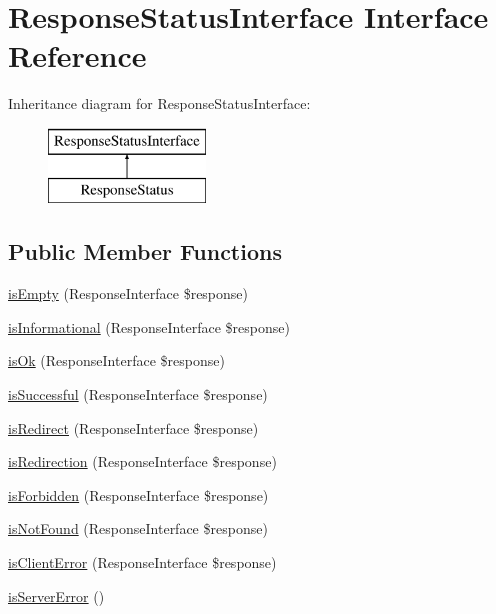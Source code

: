 \hypertarget{interface_pes_1_1_http_1_1_response_status_interface}{}\section{Response\+Status\+Interface Interface Reference}
\label{interface_pes_1_1_http_1_1_response_status_interface}
Inheritance diagram for Response\+Status\+Interface\+:\begin{figure}[H]
\begin{center}
\leavevmode
\includegraphics[height=2.000000cm]{interface_pes_1_1_http_1_1_response_status_interface}
\end{center}
\end{figure}
\subsection*{Public Member Functions}
\begin{DoxyCompactItemize}
\item 
\mbox{\hyperlink{interface_pes_1_1_http_1_1_response_status_interface_a5166ac30ac60791ad8c30d76038b9371}{is\+Empty}} (Response\+Interface \$response)
\item 
\mbox{\hyperlink{interface_pes_1_1_http_1_1_response_status_interface_aefe91e716fcd58aed7eea5eade4b7cc0}{is\+Informational}} (Response\+Interface \$response)
\item 
\mbox{\hyperlink{interface_pes_1_1_http_1_1_response_status_interface_ab3105c65ed8a2617a4928f250dba979f}{is\+Ok}} (Response\+Interface \$response)
\item 
\mbox{\hyperlink{interface_pes_1_1_http_1_1_response_status_interface_ac9309d8cf733cca95b953596caeb3969}{is\+Successful}} (Response\+Interface \$response)
\item 
\mbox{\hyperlink{interface_pes_1_1_http_1_1_response_status_interface_af59c219f65321f33f460c22d5661b751}{is\+Redirect}} (Response\+Interface \$response)
\item 
\mbox{\hyperlink{interface_pes_1_1_http_1_1_response_status_interface_a5b211efda150fe422f2ae707392168d6}{is\+Redirection}} (Response\+Interface \$response)
\item 
\mbox{\hyperlink{interface_pes_1_1_http_1_1_response_status_interface_aa0084ca7689eec6f23e6ea5f30e228fa}{is\+Forbidden}} (Response\+Interface \$response)
\item 
\mbox{\hyperlink{interface_pes_1_1_http_1_1_response_status_interface_aef4db1f3ebf7e7ddcf51de3af3471713}{is\+Not\+Found}} (Response\+Interface \$response)
\item 
\mbox{\hyperlink{interface_pes_1_1_http_1_1_response_status_interface_a3f4db87c51272174be28176a2919633d}{is\+Client\+Error}} (Response\+Interface \$response)
\item 
\mbox{\hyperlink{interface_pes_1_1_http_1_1_response_status_interface_af7068240b4b7b8206a5586a01d5c4c5c}{is\+Server\+Error}} ()
\end{DoxyCompactItemize}


